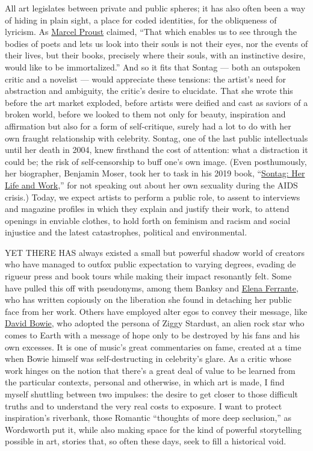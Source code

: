 All art legislates between private and public spheres; it has also often
been a way of hiding in plain sight, a place for coded identities, for
the obliqueness of lyricism. As
\href{https://www.nytimes3xbfgragh.onion/topic/person/marcel-proust}{Marcel
Proust} claimed, ``That which enables us to see through the bodies of
poets and lets us look into their souls is not their eyes, nor the
events of their lives, but their books, precisely where their souls,
with an instinctive desire, would like to be immortalized.'' And so it
fits that Sontag --- both an outspoken critic and a novelist --- would
appreciate these tensions: the artist's need for abstraction and
ambiguity, the critic's desire to elucidate. That she wrote this before
the art market exploded, before artists were deified and cast as saviors
of a broken world, before we looked to them not only for beauty,
inspiration and affirmation but also for a form of self-critique, surely
had a lot to do with her own fraught relationship with celebrity.
Sontag, one of the last public intellectuals until her death in 2004,
knew firsthand the cost of attention: what a distraction it could be;
the risk of self-censorship to buff one's own image. (Even posthumously,
her biographer, Benjamin Moser, took her to task in his 2019 book,
``\href{https://www.harpercollins.com/9780062896391/sontag/}{Sontag: Her
Life and Work},'' for not speaking out about her own sexuality during
the AIDS crisis.) Today, we expect artists to perform a public role, to
assent to interviews and magazine profiles in which they explain and
justify their work, to attend openings in enviable clothes, to hold
forth on feminism and racism and social injustice and the latest
catastrophes, political and environmental.

YET THERE HAS always existed a small but powerful shadow world of
creators who have managed to outfox public expectation to varying
degrees, evading de rigueur press and book tours while making their
impact resonantly felt. Some have pulled this off with pseudonyms, among
them Banksy and
\href{https://www.nytimes3xbfgragh.onion/2018/10/31/magazine/elena-ferrante-hbo-my-brilliant-friend.html}{Elena
Ferrante}, who has written copiously on the liberation she found in
detaching her public face from her work. Others have employed alter egos
to convey their message, like
\href{https://www.nytimes3xbfgragh.onion/topic/person/david-bowie}{David
Bowie}, who adopted the persona of Ziggy Stardust, an alien rock star
who comes to Earth with a message of hope only to be destroyed by his
fans and his own excesses. It is one of music's great commentaries on
fame, created at a time when Bowie himself was self-destructing in
celebrity's glare. As a critic whose work hinges on the notion that
there's a great deal of value to be learned from the particular
contexts, personal and otherwise, in which art is made, I find myself
shuttling between two impulses: the desire to get closer to those
difficult truths and to understand the very real costs to exposure. I
want to protect inspiration's riverbank, those Romantic ``thoughts of
more deep seclusion,'' as Wordsworth put it, while also making space for
the kind of powerful storytelling possible in art, stories that, so
often these days, seek to fill a historical void.

